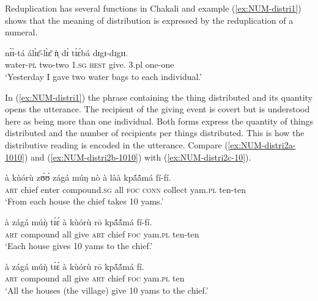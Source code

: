\begin{exe}
\begin{exe}
\begin{exe}
{\begin{exe}
\begin{exe}
\begin{exe}
\begin{exe}
\begin{exe}
\begin{exe}
\begin{exe}
\begin{exe}
\begin{exe}
Reduplication has several functions in Chakali and example 
(\ref{ex:NUM-distri1}) shows that the meaning of
distribution is expressed by the reduplication of a numeral.

\begin{exe}
\ex\label{ex:NUM-distri1}
 \gll  nɪ̀ɪ̀-tá álɪ̀ɛ̄-lɪ̀ɛ̄  ǹ̩  dɪ́ tɪ́ɛ́bá dɪgɪ-dɪgɪɪ.\\
  {water-\textsc{pl}} {two-two}   \textsc{1.sg}   \textsc{hest}   {give.\sc
3.pl} {one-one}\\
\glt  `Yesterday I gave two water bags to each individual.'\\
\end{exe}


In (\ref{ex:NUM-distri1}) the phrase containing the thing distributed and
its quantity opens the utterance. The recipient of the giving event is covert
but is
understood here as being more than one individual. Both  forms express the
quantity of things distributed and the number of recipients per things
distributed. This is how the distributive reading is
encoded in the utterance. Compare (\ref{ex:NUM-distri2a-1010}) and
(\ref{ex:NUM-distri2b-1010}) with
(\ref{ex:NUM-distri2c-10}).

 
\begin{exe}
\ex\label{ex:NUM-distri2-10}
\begin{xlist}
 
\ex\label{ex:NUM-distri2a-1010}
\gll à kùórù  zʊ́ʊ́ zágá  múŋ  nò  à làà kpã́ã́má fí-fí.\\
  \textsc{art}  {chief}  {enter}  {compound.\textsc{sg}}   {all}  \textsc{foc} 
\textsc{conn}  {collect}  {yam.\textsc{pl}}  {ten-ten}\\
\glt  `From each house the chief takes 10 yams.'

\ex\label{ex:NUM-distri2b-1010}
\gll à  zágá  múŋ̀ tɪ́ɛ́  à  kùórù rō  kpã́ã́má fí-fí.\\
  \textsc{art} {compound} {all} {give}  \textsc{art}  {chief}  \textsc{foc}
yam.\textsc{pl}  {ten-ten}\\
\glt  `Each house gives 10 yams to the chief.'

\ex\label{ex:NUM-distri2c-10}
\gll à  zágá  múŋ̀ tɪ́ɛ́  à  kùórù rō kpã́ã́má fí.\\
  \textsc{art} {compound} {all} {give}  \textsc{art}  {chief}  \textsc{foc}
yam.\textsc{pl}  ten\\
\glt  `All the houses (the village) give 10 yams to the chief.'
\end{xlist}
\end{exe}



\end{exe}
\end{exe}
\end{exe}
\end{exe}
\end{exe}
\end{exe}
\end{exe}
\end{exe}
\end{exe}}
\end{exe}
\end{exe}
\end{exe}
